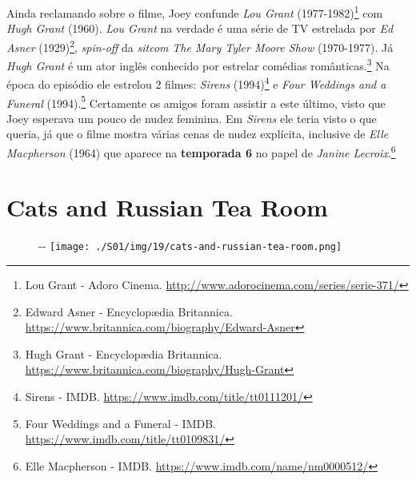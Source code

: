 Ainda reclamando sobre o filme, Joey confunde \emph{Lou Grant}
(1977-1982)\footnote{\sloppy Lou Grant - Adoro Cinema. \url{http://www.adorocinema.com/series/serie-371/}}
com \emph{Hugh Grant} (1960). \emph{Lou Grant} na verdade é uma série de
TV estrelada por \emph{Ed Asner} (1929)\footnote{\sloppy Edward Asner - Encyclopædia Britannica. \url{https://www.britannica.com/biography/Edward-Asner}},
\emph{spin-off} da \emph{sitcom} \emph{The Mary Tyler Moore Show}
(1970-1977). Já \emph{Hugh Grant} é um ator inglês conhecido por
estrelar comédias românticas.\footnote{\sloppy Hugh Grant - Encyclopædia Britannica. \url{https://www.britannica.com/biography/Hugh-Grant}}
Na época do episódio ele estrelou 2 filmes: \emph{Sirens}
(1994)\footnote{\sloppy Sirens - IMDB. \url{https://www.imdb.com/title/tt0111201/}}
e \emph{Four Weddings and a Funeral} (1994).\footnote{\sloppy Four Weddings and a Funeral - IMDB. \url{https://www.imdb.com/title/tt0109831/}}
Certamente os amigos foram assistir a este último, visto que Joey
esperava um pouco de nudez feminina. Em \emph{Sirens} ele teria visto o
que queria, já que o filme mostra várias cenas de nudez explícita,
inclusive de \emph{Elle Macpherson} (1964) que aparece na
\textbf{\textcolor{primarycolor}{temporada 6}} no papel de \emph{Janine
Lecroix}.\footnote{\sloppy Elle Macpherson - IMDB. \url{https://www.imdb.com/name/nm0000512/}}

\hypertarget{cats-and-russian-tea-room}{%
\section{Cats and Russian Tea Room}\label{cats-and-russian-tea-room}}

\begin{figure}[!ht]
  \begin{adjustwidth}{-\oddsidemargin-1in}{-\rightmargin}
    \centering
    \texttt{[image: ./S01/img/19/cats-and-russian-tea-room.png]}
  \end{adjustwidth}
\end{figure}

